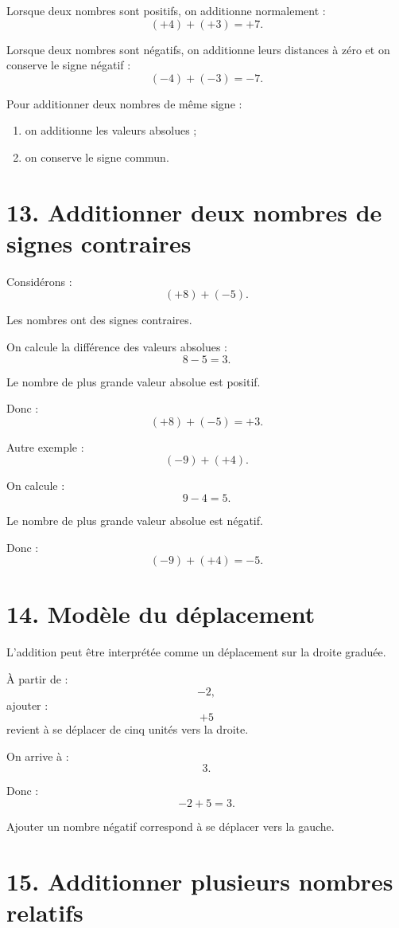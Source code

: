 Lorsque deux nombres sont positifs, on additionne normalement :
\[
(+4)+(+3)=+7.
\]

Lorsque deux nombres sont négatifs, on additionne leurs distances à zéro et on conserve le signe négatif :
\[
(-4)+(-3)=-7.
\]

\begin{propriete}
Pour additionner deux nombres de même signe :
\begin{enumerate}
\item on additionne les valeurs absolues ;
\item on conserve le signe commun.
\end{enumerate}
\end{propriete}

\section{13. Additionner deux nombres de signes contraires}

Considérons :
\[
(+8)+(-5).
\]

Les nombres ont des signes contraires.

On calcule la différence des valeurs absolues :
\[
8-5=3.
\]

Le nombre de plus grande valeur absolue est positif.

Donc :
\[
(+8)+(-5)=+3.
\]

Autre exemple :
\[
(-9)+(+4).
\]

On calcule :
\[
9-4=5.
\]

Le nombre de plus grande valeur absolue est négatif.

Donc :
\[
(-9)+(+4)=-5.
\]

\section{14. Modèle du déplacement}

L'addition peut être interprétée comme un déplacement sur la droite graduée.

À partir de :
\[
-2,
\]
ajouter :
\[
+5
\]
revient à se déplacer de cinq unités vers la droite.

On arrive à :
\[
3.
\]

Donc :
\[
-2+5=3.
\]

Ajouter un nombre négatif correspond à se déplacer vers la gauche.

\section{15. Additionner plusieurs nombres relatifs}

